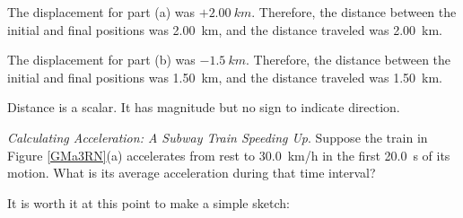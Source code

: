 \documentclass[main-ap-physics.tex]{subfiles}
\begin{document}
\vspace{1em}

The displacement for part (a) was $+\SI{2.00}{km}$. Therefore, the distance between the initial and final positions was \SI{2.00}{km}, and the distance traveled was \SI{2.00}{km}.

\vspace{1em}

The displacement for part (b) was $-\SI{1.5}{km}$. Therefore, the distance between the initial and final positions was \SI{1.50}{km}, and the distance traveled was \SI{1.50}{km}.

\vspace{1em}

Distance is a scalar. It has magnitude but no sign to indicate direction.

\endsolution

\begin{example} \label{PLCGFI}
    \textit{Calculating Acceleration: A Subway Train Speeding Up}. Suppose the train in Figure \ref{GMa3RN}(a) accelerates from rest to \SI{30.0}{km/h} in the first \SI{20.0}{s} of its motion. What is its average acceleration during that time interval?
\end{example}

\Solution It is worth it at this point to make a simple sketch:

\begin{center}
\end{center}
\end{document}

